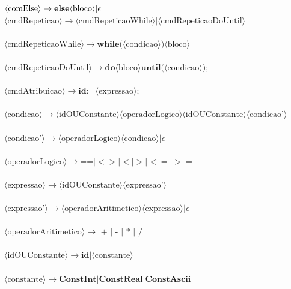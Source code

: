 \documentclass[11pt]{article}
\begin{document}
$\langle \text{comElse} \rangle \rightarrow  \textbf{else} \langle\text{bloco}\rangle | \epsilon \\\\$
$\langle\text{cmdRepeticao}\rangle \rightarrow \langle\text{cmdRepeticaoWhile}\rangle|\langle\text{cmdRepeticaoDoUntil}\rangle$\\\\
$\langle\text{cmdRepeticaoWhile}\rangle \rightarrow \textbf{while(} \langle\text{condicao}\rangle \textbf{)} \langle\text{bloco}\rangle $\\\\
$\langle\text{cmdRepeticaoDoUntil}\rangle \rightarrow \textbf{do} \langle\text{bloco}\rangle \textbf{until(} \langle\text{condicao}\rangle \textbf{)} \textbf{;}$\\\\
$\langle\text{cmdAtribuicao}\rangle \rightarrow  \textbf{id} \textbf{:=} \langle\text{expressao}\rangle \textbf{;} $\\\\
$\langle\text{condicao}\rangle \rightarrow  \langle\text{idOUConstante}\rangle \langle\text{operadorLogico}\rangle   \langle\text{idOUConstante}\rangle \langle\text{condicao'}\rangle $\\\\
$\langle\text{condicao'}\rangle \rightarrow  \langle\text{operadorLogico}\rangle\langle\text{condicao}\rangle | \epsilon $\\\\
$\langle\text{operadorLogico}\rangle \rightarrow   \textbf{==} | <> | < |  > |  <= | >=  $\\\\
$\langle\text{expressao}\rangle \rightarrow  \langle\text{idOUConstante}\rangle \langle\text{expressao'}\rangle$\\\\
$\langle\text{expressao'}\rangle \rightarrow  \langle\text{operadorAritimetico}\rangle \langle\text{expressao}\rangle| \epsilon $\\\\
$\langle\text{operadorAritimetico}\rangle \rightarrow   \textbf{ + } | \textbf{ - } | \textbf{ * } | \textbf{ / } $\\\\
$\langle\text{idOUConstante}\rangle \rightarrow  \textbf{id}| \langle\text{constante}\rangle$\\\\
$\langle\text{constante}\rangle \rightarrow  \textbf{ConstInt} | \textbf{ConstReal} | \textbf{ConstAscii} $\\\\
\end{document}

